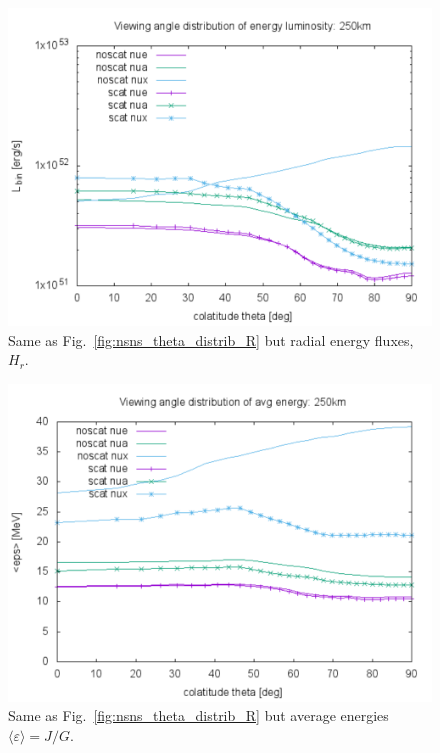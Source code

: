 \documentclass[aps,floatfix,prd,superscriptaddress,twocolumn]{revtex4-1}
\begin{document}
\begin{figure}
  \includegraphics[width=\columnwidth]{theta_distrib-250km-luminosity_L}
  \caption{Same as Fig.~\ref{fig:nsns_theta_distrib_R} but radial energy
    fluxes, $H_r$.}
  \label{fig:nsns_theta_distrib_L}
\end{figure}

\begin{figure}
  \includegraphics[width=\columnwidth]{theta_distrib-250km-avg_eps}
  \caption{Same as Fig.~\ref{fig:nsns_theta_distrib_R} but
    average energies $\langle \varepsilon \rangle = J/G$.}
  \label{fig:nsns_theta_distrib_avg_eps}
\end{figure}
\end{document}
